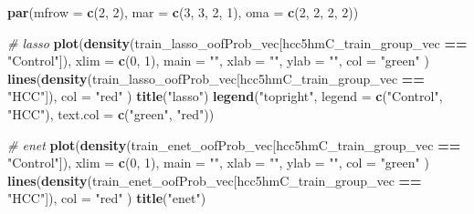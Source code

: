 \documentclass[
]{book}
\newenvironment{Shaded}{\begin{snugshade}}{\end{snugshade}}
\newcommand{\CommentTok}[1]{\textcolor[rgb]{0.56,0.35,0.01}{\textit{#1}}}
\newcommand{\DataTypeTok}[1]{\textcolor[rgb]{0.13,0.29,0.53}{#1}}
\newcommand{\DecValTok}[1]{\textcolor[rgb]{0.00,0.00,0.81}{#1}}
\newcommand{\KeywordTok}[1]{\textcolor[rgb]{0.13,0.29,0.53}{\textbf{#1}}}
\newcommand{\NormalTok}[1]{#1}
\newcommand{\OperatorTok}[1]{\textcolor[rgb]{0.81,0.36,0.00}{\textbf{#1}}}
\newcommand{\StringTok}[1]{\textcolor[rgb]{0.31,0.60,0.02}{#1}}
\begin{document}
\begin{Shaded}
\begin{Highlighting}[]
\KeywordTok{par}\NormalTok{(}\DataTypeTok{mfrow =} \KeywordTok{c}\NormalTok{(}\DecValTok{2}\NormalTok{, }\DecValTok{2}\NormalTok{), }\DataTypeTok{mar =} \KeywordTok{c}\NormalTok{(}\DecValTok{3}\NormalTok{, }\DecValTok{3}\NormalTok{, }\DecValTok{2}\NormalTok{, }\DecValTok{1}\NormalTok{), }\DataTypeTok{oma =} \KeywordTok{c}\NormalTok{(}\DecValTok{2}\NormalTok{, }\DecValTok{2}\NormalTok{, }\DecValTok{2}\NormalTok{, }\DecValTok{2}\NormalTok{))}

\CommentTok{\# lasso}
\KeywordTok{plot}\NormalTok{(}\KeywordTok{density}\NormalTok{(train\_lasso\_oofProb\_vec[hcc5hmC\_train\_group\_vec }\OperatorTok{==}\StringTok{ "Control"}\NormalTok{]),}
  \DataTypeTok{xlim =} \KeywordTok{c}\NormalTok{(}\DecValTok{0}\NormalTok{, }\DecValTok{1}\NormalTok{), }\DataTypeTok{main =} \StringTok{""}\NormalTok{, }\DataTypeTok{xlab =} \StringTok{""}\NormalTok{, }\DataTypeTok{ylab =} \StringTok{""}\NormalTok{, }\DataTypeTok{col =} \StringTok{"green"}
\NormalTok{)}
\KeywordTok{lines}\NormalTok{(}\KeywordTok{density}\NormalTok{(train\_lasso\_oofProb\_vec[hcc5hmC\_train\_group\_vec }\OperatorTok{==}\StringTok{ "HCC"}\NormalTok{]),}
  \DataTypeTok{col =} \StringTok{"red"}
\NormalTok{)}
\KeywordTok{title}\NormalTok{(}\StringTok{"lasso"}\NormalTok{)}
\KeywordTok{legend}\NormalTok{(}\StringTok{"topright"}\NormalTok{, }\DataTypeTok{legend =} \KeywordTok{c}\NormalTok{(}\StringTok{"Control"}\NormalTok{, }\StringTok{"HCC"}\NormalTok{), }\DataTypeTok{text.col =} \KeywordTok{c}\NormalTok{(}\StringTok{"green"}\NormalTok{, }\StringTok{"red"}\NormalTok{))}

\CommentTok{\# enet}
\KeywordTok{plot}\NormalTok{(}\KeywordTok{density}\NormalTok{(train\_enet\_oofProb\_vec[hcc5hmC\_train\_group\_vec }\OperatorTok{==}\StringTok{ "Control"}\NormalTok{]),}
  \DataTypeTok{xlim =} \KeywordTok{c}\NormalTok{(}\DecValTok{0}\NormalTok{, }\DecValTok{1}\NormalTok{), }\DataTypeTok{main =} \StringTok{""}\NormalTok{, }\DataTypeTok{xlab =} \StringTok{""}\NormalTok{, }\DataTypeTok{ylab =} \StringTok{""}\NormalTok{, }\DataTypeTok{col =} \StringTok{"green"}
\NormalTok{)}
\KeywordTok{lines}\NormalTok{(}\KeywordTok{density}\NormalTok{(train\_enet\_oofProb\_vec[hcc5hmC\_train\_group\_vec }\OperatorTok{==}\StringTok{ "HCC"}\NormalTok{]),}
  \DataTypeTok{col =} \StringTok{"red"}
\NormalTok{)}
\KeywordTok{title}\NormalTok{(}\StringTok{"enet"}\NormalTok{)}


\end{Highlighting}
\end{Shaded}
\end{document}

